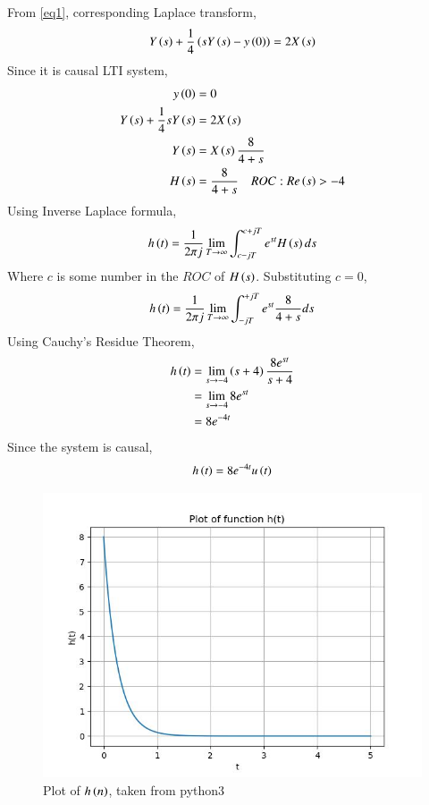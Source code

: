 \documentclass[journal,12pt,twocolumn]{IEEEtran}
\theoremstyle{remark}
\begin{document}
From \eqref{eq1}, corresponding Laplace transform, 
\begin{align}
    Y\left(s\right) + \frac{1}{4}\left(sY\left(s\right) - y\left(0\right)\right) = 2X\left(s\right)
\end{align}
Since it is causal LTI system, 
\begin{align}
    y\left(0\right) &= 0\\
    Y\left(s\right) + \frac{1}{4}sY\left(s\right) &= 2X\left(s\right)\\
    Y\left(s\right) &= X\left(s\right)\frac{8}{4 + s}\\
    H\left(s\right) &= \frac{8}{4 + s}\quad ROC:Re\left(s\right) > -4
\end{align}
Using Inverse Laplace formula, 
\begin{align}
    h\left(t\right) = \frac{1}{2\pi j}\lim_{T \to \infty} \int_{c - jT}^{c + jT} e^{st} H\left(s\right) ds
\end{align}
Where $c$ is some number in the $ROC$ of $H\left(s\right)$. Substituting $c = 0$, 
\begin{align}
    h\left(t\right) = \frac{1}{2\pi j}\lim_{T \to \infty} \int_{- jT}^{+ jT} e^{st} \frac{8}{4 + s} ds
\end{align}
Using Cauchy's Residue Theorem, 
\begin{align}
    h\left(t\right) &= \lim_{s \to -4}\left(s + 4\right)\frac{8e^{st}}{s + 4}\\
              &= \lim_{s \to -4}8e^{st}\\
              &= 8e^{-4t}
\end{align}
Since the system is causal, 
\begin{align}
    h\left(t\right) = 8e^{-4t}u\left(t\right)
\end{align}
\begin{figure}
\renewcommand\thefigure{1}
    \centering
    \includegraphics[width=1.0\columnwidth]{figs/fig_1.jpg}
    \caption{Plot of $h\left(n\right)$, taken from python3}
    \label{fig:1}
\end{figure}
\end{document}
